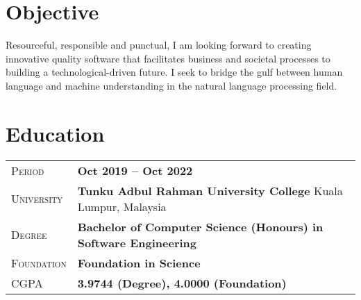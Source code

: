 \documentclass[a4paper, oneside, final]{scrartcl} %
\newcommand{\gray}{\rowcolor[gray]{.90}} %
\begin{document}
\begin{center} %


{\fontsize{36}{36}\selectfont\scshape{}} %

\vspace{0.5cm} %


\section{Objective}

{\small Resourceful, responsible and punctual, I am looking forward to creating innovative quality software that facilitates business and societal processes to building a technological-driven future. I seek to bridge the gulf between human language and machine understanding in the natural language processing field.}


\section{Education}

\begin{tabularx}{0.97\linewidth}{>{\raggedleft\scshape}p{2cm}X}
\gray Period & \textbf{ Oct 2019 – Oct 2022}\\
\gray University & \textbf{Tunku Adbul Rahman University College} \hfill Kuala Lumpur, Malaysia \\
\gray Degree & \textbf{Bachelor of Computer Science (Honours) in Software Engineering}\\
\gray Foundation & \textbf{Foundation in Science}\\
\gray CGPA & \textbf{3.9744 (Degree), 4.0000 (Foundation)}\\
\end{tabularx}


\end{center}
\end{document}
